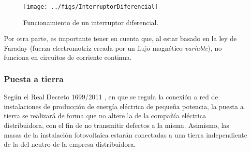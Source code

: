 %
\begin{figure}
\begin{centering}
\texttt{[image: ../figs/InterruptorDiferencial]}
\end{centering}

\caption{Funcionamiento de un interruptor diferencial.\label{fig:FuncionamientoDiferencial}}

\end{figure}


Por otra parte, es importante tener en cuenta que, al estar basado
en la ley de Faraday (fuerza electromotriz creada por un flujo magnético
\emph{variable}), no funciona en circuitos de corriente continua.

\subsubsection{Puesta a tierra}

Según el Real Decreto 1699/2011 \cite{RealDecreto2011}, en que se
regula la conexión a red de instalaciones de producción de energía
eléctrica de pequeña potencia, la puesta a tierra se realizará de
forma que no altere la de la compañía eléctrica distribuidora, con el
fin de no transmitir defectos a la misma. Asimismo, las masas de la
instalación fotovoltaica estarán conectadas a una tierra independiente
de la del neutro de la empresa distribuidora.

